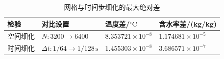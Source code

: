 \begin{table}[htbp]
\centering
\caption{网格与时间步细化的最大绝对差}
\label{tab:q1-refinement}
\small
\begin{tabular}{llll}
\toprule
检验 & 对比设置 & 温度差/$^\circ\mathrm C$ & 含水率差/(kg/kg) \\
\midrule
空间细化 & $N:3200\to6400$ & $8.353721\times10^{-8}$ & $1.174681\times10^{-5}$ \\
时间细化 & $\Delta t:1/64\to1/128\,\mathrm{s}$ & $1.455303\times10^{-8}$ & $3.686571\times10^{-7}$ \\
\bottomrule
\end{tabular}
\end{table}
